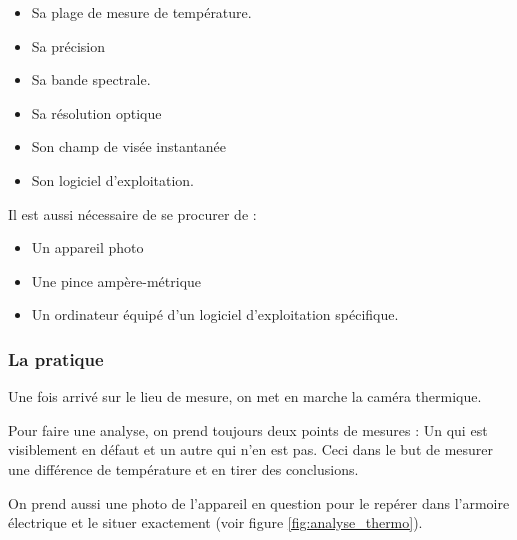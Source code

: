 \begin{itemize}
\item Sa plage de mesure de température.
\item Sa précision
\item Sa bande spectrale.
\item Sa résolution optique
\item Son champ de visée instantanée%
\item Son logiciel d'exploitation.

\end{itemize}
Il est  aussi  nécessaire de se procurer de :  
 
 \begin{itemize}
 
\item Un appareil photo
\item Une pince ampère-métrique
\item Un ordinateur équipé d'un logiciel d'exploitation spécifique. \end{itemize}
\subsubsection{La pratique}
Une fois arrivé sur le lieu de mesure, on met en marche la caméra thermique. 

Pour faire une analyse, on prend toujours deux points de mesures : Un qui est visiblement en défaut et un autre qui n'en est pas. Ceci dans le but de mesurer une différence de température et en tirer des conclusions.       

On prend aussi une photo de l'appareil en question pour le repérer dans l'armoire électrique et le situer exactement (voir figure \ref{fig:analyse_thermo}).

